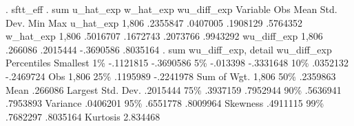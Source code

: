 . sftt_eff
{\smallskip}
. sum u_hat_exp w_hat_exp wu_diff_exp
{\smallskip}
    Variable {\VBAR}        Obs        Mean    Std. Dev.       Min        Max
   u_hat_exp {\VBAR}      1,806    .2355847    .0407005   .1908129   .5764352
   w_hat_exp {\VBAR}      1,806    .5016707    .1672743   .2073766   .9943292
 wu_diff_exp {\VBAR}      1,806     .266086    .2015444  -.3690586   .8035164
{\smallskip}
. sum wu_diff_exp, detail
{\smallskip}
                         wu_diff_exp
      Percentiles      Smallest
 1\%    -.1121815      -.3690586
 5\%     -.013398      -.3331648
10\%     .0352132      -.2469724       Obs               1,806
25\%     .1195989      -.2241978       Sum of Wgt.       1,806
{\smallskip}
50\%     .2359863                      Mean            .266086
                        Largest       Std. Dev.      .2015444
75\%     .3937159       .7952944
90\%     .5636941       .7953893       Variance       .0406201
95\%     .6551778       .8009964       Skewness       .4911115
99\%     .7682297       .8035164       Kurtosis       2.834468
{\smallskip}
